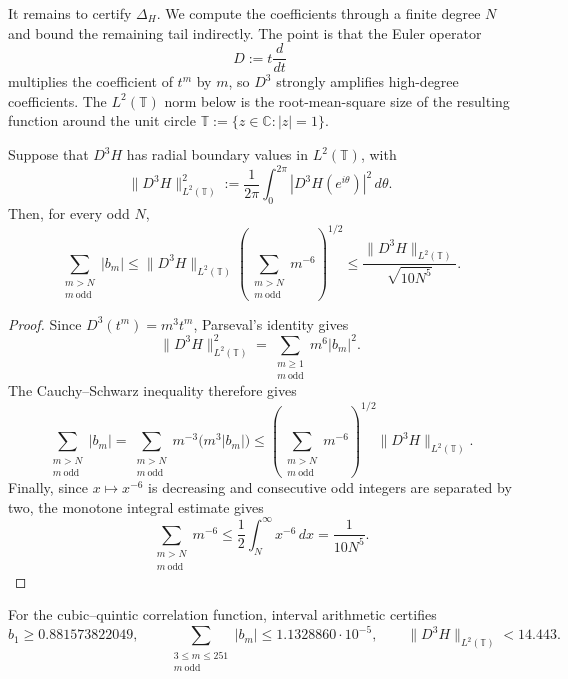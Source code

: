 It remains to certify $\Delta_H$.  We compute the coefficients through a
finite degree $N$ and bound the remaining tail indirectly.  The point is that
the Euler operator
\[
  D:=t\frac{d}{dt}
\]
multiplies the coefficient of $t^m$ by $m$, so $D^3$ strongly amplifies
high-degree coefficients.  The $L^2(\mathbb T)$ norm below is the
root-mean-square size of the resulting function around the unit circle
$\mathbb T:=\{z\in\mathbb C:|z|=1\}$.

\begin{lemma}
\label{lem:third-order-tail}
Suppose that $D^3H$ has radial boundary values in $L^2(\mathbb T)$, with
\[
  \|D^3H\|_{L^2(\mathbb T)}^2
  :=\frac{1}{2\pi}\int_0^{2\pi}
  |D^3H(e^{i\theta})|^2\,d\theta.
\]
Then, for every odd $N$,
\begin{equation}
  \sum_{\substack{m>N\\m\ \mathrm{odd}}}|b_m|
  \le
  \|D^3H\|_{L^2(\mathbb T)}
  \left(\sum_{\substack{m>N\\m\ \mathrm{odd}}}m^{-6}\right)^{1/2}
  \le
  \frac{\|D^3H\|_{L^2(\mathbb T)}}{\sqrt{10N^5}}.
  \label{eq:third-order-tail}
\end{equation}
\end{lemma}

\begin{proof}
Since $D^3(t^m)=m^3t^m$, Parseval's identity gives
\begin{equation}
  \|D^3H\|_{L^2(\mathbb T)}^2
  =\sum_{\substack{m\ge1\\m\ \mathrm{odd}}}m^6|b_m|^2.
  \label{eq:parseval-third-order}
\end{equation}
The Cauchy--Schwarz inequality therefore gives
\[
  \sum_{\substack{m>N\\m\ \mathrm{odd}}}|b_m|
  =\sum_{\substack{m>N\\m\ \mathrm{odd}}}
  m^{-3}\bigl(m^3|b_m|\bigr)
  \le
  \left(\sum_{\substack{m>N\\m\ \mathrm{odd}}}m^{-6}\right)^{1/2}
  \|D^3H\|_{L^2(\mathbb T)}.
\]
Finally, since $x\mapsto x^{-6}$ is decreasing and consecutive odd integers
are separated by two, the monotone integral estimate gives
\[
  \sum_{\substack{m>N\\m\ \mathrm{odd}}}m^{-6}
  \le\frac12\int_N^\infty x^{-6}\,dx
  =\frac{1}{10N^5}.
\]
\end{proof}

\begin{proposition}
\label{prop:certified-numerical-input}
For the cubic--quintic correlation function, interval arithmetic certifies
\begin{equation}
  b_1\ge0.881573822049,
  \qquad
  \sum_{\substack{3\le m\le251\\m\ \mathrm{odd}}}|b_m|
  \le1.1328860\cdot10^{-5},
  \qquad
  \|D^3H\|_{L^2(\mathbb T)}<14.443.
  \label{eq:certified-numerical-input}
\end{equation}
\end{proposition}

